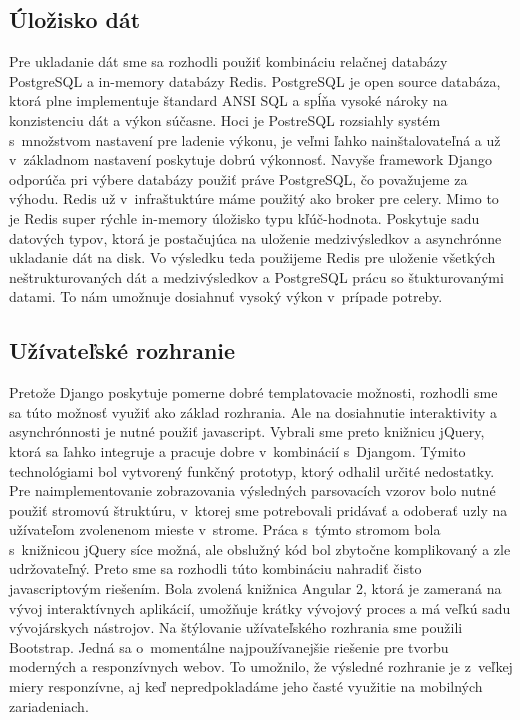 \subsection{Úložisko dát}
\label{sec:store}
Pre ukladanie dát sme sa rozhodli použiť kombináciu relačnej databázy PostgreSQL a in-memory databázy Redis. PostgreSQL je open source databáza, ktorá plne implementuje štandard ANSI SQL a spĺňa vysoké nároky na konzistenciu dát a výkon súčasne. Hoci je PostreSQL  rozsiahly systém s~množstvom nastavení pre ladenie výkonu, je veľmi ľahko nainštalovateľná a už v~základnom nastavení poskytuje dobrú výkonnosť. Navyše framework Django odporúča pri výbere databázy použiť práve PostgreSQL, čo považujeme za výhodu. Redis už v~infraštuktúre máme použitý ako broker pre celery. Mimo to je Redis super rýchle in-memory úložisko typu kľúč-hodnota. Poskytuje sadu datových typov, ktorá je postačujúca na uloženie medzivýsledkov a asynchrónne ukladanie dát na disk.
Vo výsledku teda použijeme Redis pre uloženie všetkých neštrukturovaných dát a medzivýsledkov a PostgreSQL prácu so štukturovanými datami. To nám umožnuje dosiahnuť vysoký výkon v~prípade potreby.

\subsection{Užívateľské rozhranie}
Pretože Django poskytuje pomerne dobré templatovacie možnosti, rozhodli sme sa túto možnosť využiť ako základ rozhrania. Ale na dosiahnutie interaktivity a asynchrónnosti je nutné použiť javascript. Vybrali sme preto knižnicu jQuery, ktorá sa ľahko integruje a pracuje dobre v~kombinácií s~Djangom. Týmito technológiami bol vytvorený funkčný prototyp, ktorý odhalil určité nedostatky. Pre naimplementovanie zobrazovania výsledných parsovacích vzorov bolo nutné použiť stromovú štruktúru, v~ktorej sme potrebovali pridávať a odoberať uzly na užívateľom zvolenenom mieste v~strome. Práca s~týmto stromom bola s~knižnicou jQuery síce možná, ale obslužný kód bol zbytočne komplikovaný a zle udržovateľný. Preto sme sa rozhodli túto kombináciu nahradiť čisto javascriptovým riešením. Bola zvolená knižnica Angular 2, ktorá je zameraná na vývoj interaktívnych aplikácií, umožňuje krátky vývojový proces a má veľkú sadu vývojárskych nástrojov.
Na štýlovanie užívateľského rozhrania sme použili Bootstrap. Jedná sa o~momentálne najpoužívanejšie riešenie pre tvorbu moderných a responzívnych webov. To umožnilo, že výsledné rozhranie je z~veľkej miery responzívne, aj keď nepredpokladáme jeho časté využitie na mobilných zariadeniach.

